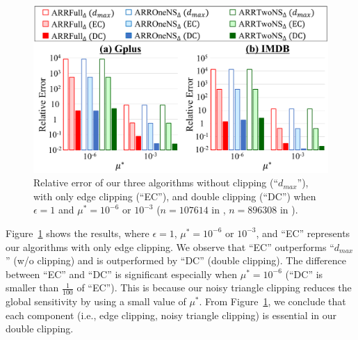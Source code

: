 {\begin{figure}[t]
  \centering
  \includegraphics[width=0.99\linewidth]{fig/res2_w_Lap_EC.pdf}
  
  \caption[Relative error of our three algorithms without clipping, with only edge clipping, and with double clipping.]{Relative error of our three algorithms without clipping (``$d_{max}$''), with only edge clipping (``EC''), and double clipping (``DC'') when $\epsilon=1$ and $\mu^* = 10^{-6}$ or $10^{-3}$ ($n=107614$ in \GPlus{}, $n=896308$ in \IMDB{}).}
  \label{chap2-fig:res2_w_Lap_EC}
\end{figure}

Figure~\ref{chap2-fig:res2_w_Lap_EC} shows the results, where $\epsilon=1$, $\mu^* = 10^{-6}$ or $10^{-3}$, and ``EC'' represents our algorithms with only
edge clipping.
We observe that ``EC''
outperforms ``$d_{max}$'' (w/o clipping) and is outperformed by ``DC'' (double clipping).
The difference between ``EC'' and ``DC'' is significant especially when $\mu^* = 10^{-6}$ (``DC'' is smaller than $\frac{1}{100}$ of ``EC'').
This is because our noisy triangle clipping reduces the global sensitivity by using a small value of
$\mu^*$. 
From Figure~\ref{chap2-fig:res2_w_Lap_EC}, we conclude that each component (i.e.,
edge clipping, noisy triangle clipping) is essential in our double clipping.

}
